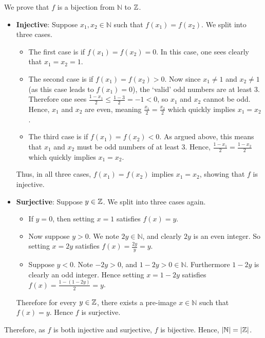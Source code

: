 \begin{questions}
    \item We prove that $f$ is a bijection from $\mathbb{N}$ to $\mathbb{Z}$.
    \begin{itemize}
        \item \textbf{Injective}: Suppose $x_1, x_2 \in \mathbb{N}$ such that $f(x_1) = f(x_2)$. We split into three cases.
        \begin{itemize}
            \item The first case is if $f(x_1) = f(x_2) = 0$. In this case, one sees clearly that $x_1 = x_2 = 1$.
            \item The second case is if $f(x_1) = f(x_2) > 0$. Now since $x_1 \neq 1$ and $x_2 \neq 1$ (as this case leads to $f(x_1) = 0$), the `valid' odd numbers are at least 3. Therefore one sees $\frac{1-x_1}{2} \leq \frac{1-3}{2} = -1 < 0$, so $x_1$ and $x_2$ cannot be odd. Hence, $x_1$ and $x_2$ are even, meaning $\frac{x_1}{2} = \frac{x_2}{2}$ which quickly implies $x_1 = x_2$.
            \item The third case is if $f(x_1) = f(x_2) < 0$. As argued above, this means that $x_1$ and $x_2$ must be odd numbers of at least 3. Hence, $\frac{1-x_1}{2} = \frac{1-x_2}{2}$ which quickly implies $x_1 = x_2$.
        \end{itemize}
        Thus, in all three cases, $f(x_1) = f(x_2)$ implies $x_1 = x_2$, showing that $f$ is injective.
        
        \item \textbf{Surjective}: Suppose $y \in \mathbb{Z}$. We split into three cases again.
        \begin{itemize}
            \item If $y = 0$, then setting $x = 1$ satisfies $f(x) = y$.
            \item Now suppose $y > 0$. We note $2y \in \mathbb{N}$, and clearly $2y$ is an even integer. So setting $x = 2y$ satisfies $f(x) = \frac{2y}{y} = y$.
            \item Suppose $y < 0$. Note $-2y > 0$, and $1 - 2y > 0 \in \mathbb{N}$. Furthermore $1 - 2y$ is clearly an odd integer. Hence setting $x = 1 - 2y$ satisfies $f(x) = \frac{1-(1-2y)}{2} = y$.
        \end{itemize}
        Therefore for every $y \in \mathbb{Z}$, there exists a pre-image $x \in \mathbb{N}$ such that $f(x) = y$. Hence $f$ is surjective.
    \end{itemize}
    Therefore, as $f$ is both injective and surjective, $f$ is bijective. Hence, $|\mathbb{N}| = |\mathbb{Z}|$.
\end{questions}

